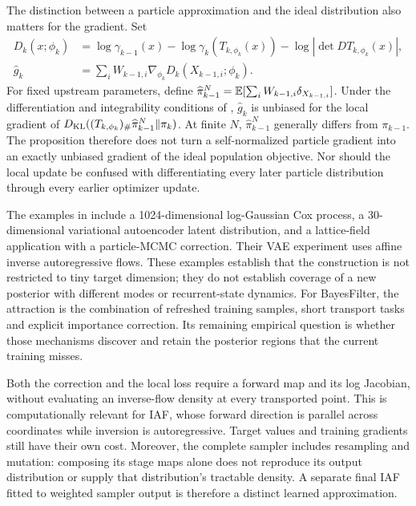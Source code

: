 The distinction between a particle approximation and the ideal distribution
also matters for the gradient. Set
\begin{align}
 D_k(x;\phi_k)&=\log\gamma_{k-1}(x)
       -\log\gamma_k(T_{k,\phi_k}(x))
       -\log|\det DT_{k,\phi_k}(x)|,\nonumber\\
 \widehat g_k&=\sum_i W_{k-1,i}\nabla_{\phi_k}D_k(X_{k-1,i};\phi_k).
 \label{eq:bf-is-craft-local-gradient}
\end{align}
For fixed upstream parameters, define
$\widehat\pi_{k-1}^N=\mathbb{E}[\sum_i W_{k-1,i}\delta_{X_{k-1,i}}]$.
Under the differentiation and integrability conditions of
\citet[Proposition 2]{matthews2022craft}, $\widehat g_k$ is unbiased for
the local gradient of
$D_{\rm KL}((T_{k,\phi_k})_\#\widehat\pi_{k-1}^N\Vert\pi_k)$.
At finite $N$, $\widehat\pi_{k-1}^N$ generally differs from $\pi_{k-1}$.
The proposition therefore does not turn a self-normalized particle
gradient into an exactly unbiased gradient of the ideal population objective.
Nor should the local update be confused with differentiating every later
particle distribution through every earlier optimizer update.

The examples in \citet[Sections 4.1--4.3]{matthews2022craft} include a
1024-dimensional log-Gaussian Cox process, a 30-dimensional variational
autoencoder latent distribution, and a lattice-field application with a
particle-MCMC correction. Their VAE experiment uses affine inverse
autoregressive flows. These examples establish that the construction is
not restricted to tiny target dimension; they do not establish coverage
of a new posterior with different modes or recurrent-state dynamics.
For BayesFilter, the attraction is the combination of refreshed training
samples, short transport tasks and explicit importance correction. Its
remaining empirical question is whether those mechanisms discover and
retain the posterior regions that the current training misses.

Both the correction and the local loss require a forward map and its log
Jacobian, without evaluating an inverse-flow density at every transported
point. This is computationally relevant for IAF, whose forward direction
is parallel across coordinates while inversion is autoregressive. Target
values and training gradients still have their own cost. Moreover, the
complete sampler includes resampling and mutation: composing its stage
maps alone does not reproduce its output distribution or supply that
distribution's tractable density. A separate final IAF fitted to weighted
sampler output is therefore a distinct learned approximation.


